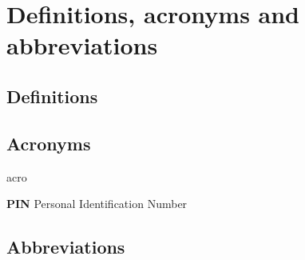 \section{Definitions, acronyms and abbreviations}

\subsection{Definitions}
\subsection{Acronyms}
	\begin{labeling}{acro}
		\item[\textbf{PIN}] Personal Identification Number
	\end{labeling}
\subsection{Abbreviations}
